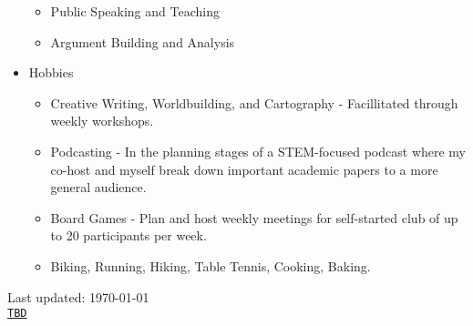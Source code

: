 \documentclass[letterpaper]{article}
\def\footerlink{TBD}
\begin{document}
\begin{itemize}
\begin{itemize}
    \item Public Speaking and Teaching
    \item Argument Building and Analysis
  \end{itemize}
  \item Hobbies
  \begin{itemize}
    \item Creative Writing, Worldbuilding, and Cartography - Facillitated through weekly workshops.
    \item Podcasting - In the planning stages of a STEM-focused podcast where my co-host and myself break down important academic papers to a more general audience.
    \item Board Games - Plan and host weekly meetings for self-started club of up to 20 participants per week.
    \item Biking, Running, Hiking, Table Tennis, Cooking, Baking.
  \end{itemize}
\end{itemize}



\bigskip

\begin{center}
  \begin{footnotesize}
    Last updated: \today \\
    \href{\footerlink}{\texttt{\footerlink}}
  \end{footnotesize}
\end{center}
\end{document}
